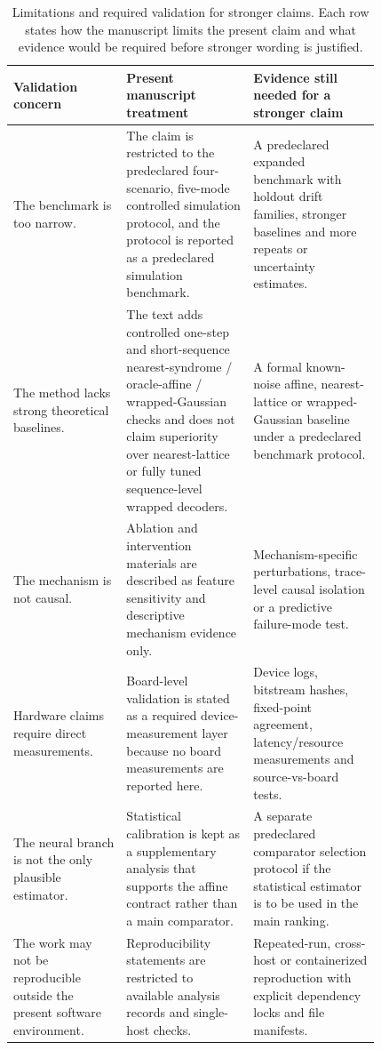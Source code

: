 \documentclass[11pt]{article}
\newcommand{\softwarehil}{controlled simulation}
\begin{document}
\begin{table}[htbp]
\centering
\small
\begin{tabular}{@{}>{\raggedright\arraybackslash}p{0.24\linewidth}>{\raggedright\arraybackslash}p{0.29\linewidth}>{\raggedright\arraybackslash}p{0.29\linewidth}@{}}
\toprule
Validation concern & Present manuscript treatment & Evidence still needed for a stronger claim \\
\midrule
The benchmark is too narrow. & The claim is restricted to the predeclared
four-scenario, five-mode \softwarehil{} protocol, and the protocol is reported
as a predeclared simulation benchmark. & A predeclared expanded benchmark with
holdout drift families, stronger baselines and more repeats or uncertainty
estimates. \\
\addlinespace
The method lacks strong theoretical baselines. & The text adds controlled
one-step and short-sequence nearest-syndrome / oracle-affine /
wrapped-Gaussian checks and does not claim superiority over nearest-lattice or
fully tuned sequence-level wrapped decoders. & A formal known-noise affine, nearest-lattice or
wrapped-Gaussian baseline under a predeclared benchmark protocol. \\
\addlinespace
The mechanism is not causal. & Ablation and intervention materials are
described as feature sensitivity and descriptive mechanism evidence only. &
Mechanism-specific perturbations, trace-level causal isolation or a predictive
failure-mode test. \\
\addlinespace
Hardware claims require direct measurements. & Board-level validation is stated
as a required device-measurement layer because no board measurements are reported here. & Device
logs, bitstream hashes, fixed-point agreement, latency/resource measurements
and source-vs-board tests. \\
\addlinespace
The neural branch is not the only plausible estimator. & Statistical
calibration is kept as a supplementary analysis that supports the affine
contract rather than a main comparator. & A separate predeclared comparator
selection protocol if the statistical estimator is to be used in the
main ranking. \\
\addlinespace
The work may not be reproducible outside the present software environment. & Reproducibility
statements are restricted to available analysis records and single-host
checks. & Repeated-run, cross-host or containerized reproduction with explicit
dependency locks and file manifests. \\
\bottomrule
\end{tabular}
\caption{Limitations and required validation for stronger claims.  Each row
states how the manuscript limits the present claim and what evidence would be
required before stronger wording is justified.}
\label{tab:validation-risk-response}
\end{table}
\end{document}
